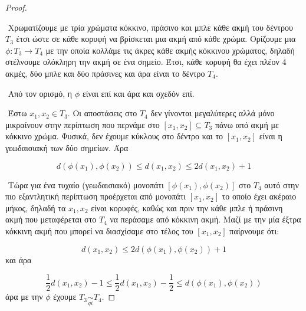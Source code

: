 \documentclass[oneside,a4paper]{article}
\begin{document}
\begin{proof} $ $


$ $\newline
Χρωματίζουμε με τρία χρώματα κόκκινο, πράσινο και μπλε κάθε ακμή του δέντρου $T_3$ έτσι ώστε σε κάθε κορυφή να βρίσκεται μια ακμή από κάθε χρώμα. Ορίζουμε μια $\phi : T_3 \rightarrow T_4$ με την οποία κολλάμε τις άκρες κάθε ακμής κόκκινου χρώματος, δηλαδή στέλνουμε ολόκληρη την ακμή σε ένα σημείο. Έτσι, κάθε κορυφή θα έχει πλέον 4 ακμές, δύο μπλε και δύο πράσινες και άρα είναι το δέντρο $T_4$.

$ $\newline
Από τον ορισμό, η $\phi$ είναι επί και άρα και σχεδόν επί.

$ $\newline
Έστω $x_1,x_2 \in T_3$. Οι αποστάσεις στο $T_4$ δεν γίνονται μεγαλύτερες αλλά μόνο μικραίνουν στην περίπτωση που περνάμε στο $[x_1,x_2] \subseteq T_3$ πάνω από ακμή με κόκκινο χρώμα. Φυσικά, δεν έχουμε κύκλους στο δέντρο και το $[x_1,x_2]$ είναι η γεωδαισιακή των δύο σημείων. Άρα

$$d(\phi(x_1),\phi(x_2)) \leq d(x_1,x_2) \leq 2d(x_1,x_2) + 1$$

$ $\newline
Τώρα για ένα τυχαίο (γεωδαισιακό) μονοπάτι $[\phi(x_1),\phi(x_2)]$ στο $T_4$ αυτό στην πιο εξαντλητική περίπτωση προέρχεται από μονοπάτι $[x_1,x_2]$ το οποίο έχει ακέραιο μήκος, δηλαδή τα $x_1,x_2$ είναι κορυφές, καθώς και πριν την κάθε μπλε ή πράσινη ακμή που μεταφέρεται στο $T_4$ να περάσαμε από κόκκινη ακμή. Μαζί με την μία έξτρα κόκκινη ακμή που μπορεί να διασχίσαμε στο τέλος του $[x_1,x_2]$ παίρνουμε ότι:

$$d(x_1,x_2) \leq 2d(\phi(x_1),\phi(x_2)) + 1$$ και άρα

$$\frac{1}{2} d(x_1,x_2) -1 \leq \frac12 d(x_1,x_2) -\frac12 \leq d(\phi(x_1),\phi(x_2))$$ άρα με την $\phi$ έχουμε $T_3\underset{qi}{\sim} T_4$.
\end{proof}
\end{document}
